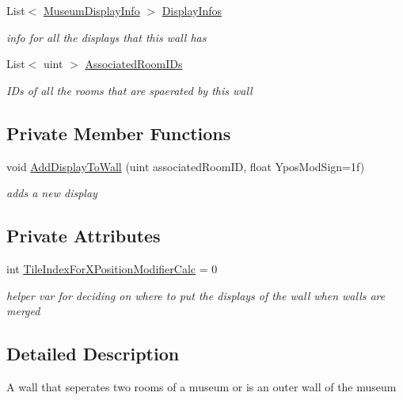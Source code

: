 \begin{DoxyCompactItemize}
List$<$ \mbox{\hyperlink{class_museum_display_info}{Museum\+Display\+Info}} $>$ \mbox{\hyperlink{class_wall_a5fc68c5010cd944a5103f84a749e87f7}{Display\+Infos}}
\begin{DoxyCompactList}\small\item\em info for all the displays that this wall has \end{DoxyCompactList}\item 
List$<$ uint $>$ \mbox{\hyperlink{class_wall_aa49042aeda37b3ad734a101f1df834eb}{Associated\+Room\+I\+Ds}}
\begin{DoxyCompactList}\small\item\em I\+Ds of all the rooms that are spaerated by this wall \end{DoxyCompactList}\end{DoxyCompactItemize}
\subsection*{Private Member Functions}
\begin{DoxyCompactItemize}
\item 
void \mbox{\hyperlink{class_wall_a2c2ccc6de461b4979816536859ef591c}{Add\+Display\+To\+Wall}} (uint associated\+Room\+ID, float Ypos\+Mod\+Sign=1f)
\begin{DoxyCompactList}\small\item\em adds a new display \end{DoxyCompactList}\end{DoxyCompactItemize}
\subsection*{Private Attributes}
\begin{DoxyCompactItemize}
\item 
int \mbox{\hyperlink{class_wall_a0923767dab07b7c3018ce3a6ceacd306}{Tile\+Index\+For\+X\+Position\+Modifier\+Calc}} = 0
\begin{DoxyCompactList}\small\item\em helper var for deciding on where to put the displays of the wall when walls are merged \end{DoxyCompactList}\end{DoxyCompactItemize}


\subsection{Detailed Description}
A wall that seperates two rooms of a museum or is an outer wall of the museum 



